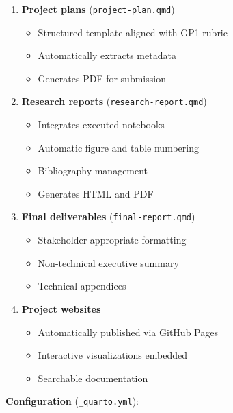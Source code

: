 \documentclass[
  oneside,
  open=any]{scrbook}
\providecommand{\tightlist}{%
  \setlength{\itemsep}{0pt}\setlength{\parskip}{0pt}}\usepackage{longtable,booktabs,array}
\begin{document}
\begin{enumerate}
\def\labelenumi{\arabic{enumi}.}
\tightlist
\item
  \textbf{Project plans} (\texttt{project-plan.qmd})

  \begin{itemize}
  \tightlist
  \item
    Structured template aligned with GP1 rubric
  \item
    Automatically extracts metadata
  \item
    Generates PDF for submission
  \end{itemize}
\item
  \textbf{Research reports} (\texttt{research-report.qmd})

  \begin{itemize}
  \tightlist
  \item
    Integrates executed notebooks
  \item
    Automatic figure and table numbering
  \item
    Bibliography management
  \item
    Generates HTML and PDF
  \end{itemize}
\item
  \textbf{Final deliverables} (\texttt{final-report.qmd})

  \begin{itemize}
  \tightlist
  \item
    Stakeholder-appropriate formatting
  \item
    Non-technical executive summary
  \item
    Technical appendices
  \end{itemize}
\item
  \textbf{Project websites}

  \begin{itemize}
  \tightlist
  \item
    Automatically published via GitHub Pages
  \item
    Interactive visualizations embedded
  \item
    Searchable documentation
  \end{itemize}
\end{enumerate}

\textbf{Configuration} (\texttt{\_quarto.yml}):
\end{document}
